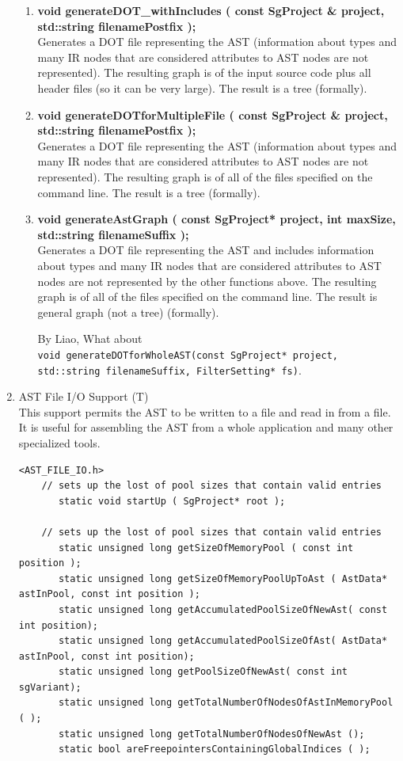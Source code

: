 \begin{enumerate}
\begin{enumerate}
      \item {\bf void generateDOT\_withIncludes ( const SgProject \& project, std::string filenamePostfix );} \\
      Generates a DOT file representing the AST (information about types and many IR nodes
      that are considered attributes to AST nodes are not represented).
      The resulting graph is of the input source code plus all header files (so it can be
      very large). The result is a tree (formally).

      \item {\bf void generateDOTforMultipleFile ( const SgProject \& project, std::string filenamePostfix );} \\
      Generates a DOT file representing the AST (information about types and many IR nodes
      that are considered attributes to AST nodes are not represented).
      The resulting graph is of all of the files specified on the command line.
      The result is a tree (formally).

      \item {\bf void generateAstGraph ( const SgProject* project, int maxSize, std::string filenameSuffix );} \\
      Generates a DOT file representing the AST and includes information about types and many IR nodes
      that are considered attributes to AST nodes are not represented by the other
      functions above. The resulting graph is of all of the files specified on the command line.
      The result is general graph (not a tree) (formally).
 
 By Liao, What about\\
 \lstinline{void generateDOTforWholeAST(const SgProject* project, std::string filenameSuffix, FilterSetting* fs)}.
   \end{enumerate}

   \item AST File I/O Support (T) \\
         This support permits the AST to be written to a file and read in from a file.
         It is useful for assembling the AST from a whole application and many other
         specialized tools.
         \begin{lstlisting}
<AST_FILE_IO.h>
    // sets up the lost of pool sizes that contain valid entries 
       static void startUp ( SgProject* root ); 

    // sets up the lost of pool sizes that contain valid entries 
       static unsigned long getSizeOfMemoryPool ( const int position ); 
       static unsigned long getSizeOfMemoryPoolUpToAst ( AstData* astInPool, const int position ); 
       static unsigned long getAccumulatedPoolSizeOfNewAst( const int position);
       static unsigned long getAccumulatedPoolSizeOfAst( AstData* astInPool, const int position);
       static unsigned long getPoolSizeOfNewAst( const int sgVariant);
       static unsigned long getTotalNumberOfNodesOfAstInMemoryPool ( ); 
       static unsigned long getTotalNumberOfNodesOfNewAst ();
       static bool areFreepointersContainingGlobalIndices ( );


\end{lstlisting}
\end{enumerate}
